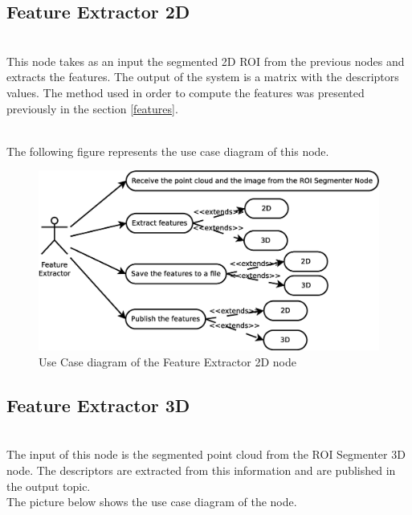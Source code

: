 \subsection{Feature Extractor 2D}\\
	This node takes as an input the segmented 2D ROI from the previous nodes and extracts the features. The output of the system is a matrix with the descriptors values. The method used in order to compute the features was presented previously in the section  \ref{features}.

	\\

	The following figure represents the use case diagram of this node. 
	\begin{figure}[h]
		\begin{center}
			\includegraphics[scale=0.2]{img/diagrams/uc_feature_extractor.eps}
			\caption[Use case diagram Feature Extractor 2D node]{Use Case diagram of the Feature Extractor 2D node}
		\end{center}
	\end{figure}

\subsection{Feature Extractor 3D}\\
	The input of this node is the segmented point cloud from the ROI Segmenter 3D node. The descriptors are extracted from this information and are published in the output topic. 
	\\

	The picture below shows the use case diagram of the node. 

